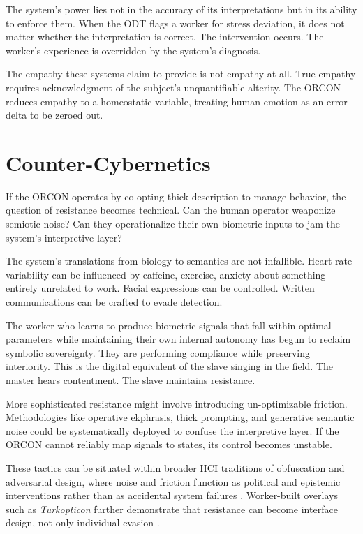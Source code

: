 \documentclass[runningheads]{llncs}
\begin{document}
The system's power lies not in the accuracy of its interpretations but in its ability to enforce them. When the ODT flags a worker for stress deviation, it does not matter whether the interpretation is correct. The intervention occurs. The worker's experience is overridden by the system's diagnosis. 

The empathy these systems claim to provide is not empathy at all. True empathy requires acknowledgment of the subject's unquantifiable alterity. The ORCON reduces empathy to a homeostatic variable, treating human emotion as an error delta to be zeroed out.

\section{Counter-Cybernetics}

If the ORCON operates by co-opting thick description to manage behavior, the question of resistance becomes technical. Can the human operator weaponize semiotic noise? Can they operationalize their own biometric inputs to jam the system's interpretive layer?

The system's translations from biology to semantics are not infallible. Heart rate variability can be influenced by caffeine, exercise, anxiety about something entirely unrelated to work. Facial expressions can be controlled. Written communications can be crafted to evade detection.

The worker who learns to produce biometric signals that fall within optimal parameters while maintaining their own internal autonomy has begun to reclaim symbolic sovereignty. They are performing compliance while preserving interiority. This is the digital equivalent of the slave singing in the field. The master hears contentment. The slave maintains resistance.

More sophisticated resistance might involve introducing un-optimizable friction. Methodologies like operative ekphrasis, thick prompting, and generative semantic noise could be systematically deployed to confuse the interpretive layer. If the ORCON cannot reliably map signals to states, its control becomes unstable.

These tactics can be situated within broader HCI traditions of obfuscation and adversarial design, where noise and friction function as political and epistemic interventions rather than as accidental system failures \cite{nissenbaum2015obfuscation,disalvo2012adversarial}. Worker-built overlays such as \textit{Turkopticon} further demonstrate that resistance can become interface design, not only individual evasion \cite{irani2013turkopticon}.
\end{document}
